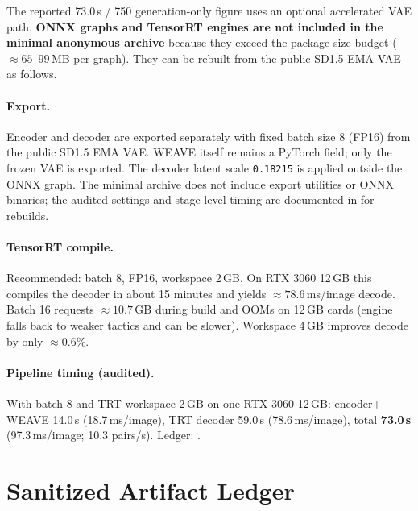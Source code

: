 \documentclass[letterpaper]{article}
\begin{document}
The reported 73.0\,s / 750 generation-only figure uses an optional accelerated VAE path.
\textbf{ONNX graphs and TensorRT engines are not included in the minimal anonymous archive}
because they exceed the package size budget ($\approx\!65$--$99$\,MB per graph). They can
be rebuilt from the public SD1.5 EMA VAE as follows.

\paragraph{Export.}
Encoder and decoder are exported separately with fixed batch size 8 (FP16) from the public
SD1.5 EMA VAE. WEAVE itself remains a PyTorch field; only the frozen VAE is exported. The
decoder latent scale \texttt{0.18215} is applied outside the ONNX graph. The minimal archive
does not include export utilities or ONNX binaries; the audited settings and stage-level
timing are documented in  for rebuilds.

\paragraph{TensorRT compile.}
Recommended: batch 8, FP16, workspace 2\,GB. On RTX 3060 12\,GB this compiles the decoder
in about 15 minutes and yields $\approx\!78.6$\,ms/image decode. Batch 16 requests
$\approx\!10.7$\,GB during build and OOMs on 12\,GB cards (engine falls back to weaker
tactics and can be slower). Workspace 4\,GB improves decode by only $\approx\!0.6\%$.

\paragraph{Pipeline timing (audited).}
With batch 8 and TRT workspace 2\,GB on one RTX 3060 12\,GB:
encoder$+$WEAVE 14.0\,s (18.7\,ms/image), TRT decoder 59.0\,s (78.6\,ms/image), total
\textbf{73.0\,s} (97.3\,ms/image; 10.3 pairs/s). Ledger:
.

\section{Sanitized Artifact Ledger}
\end{document}
